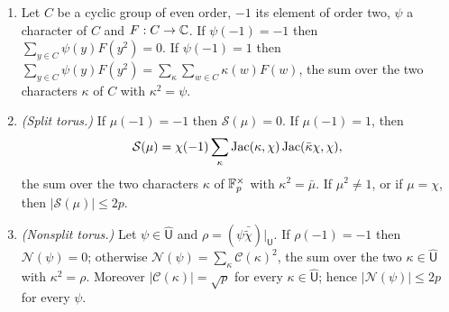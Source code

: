 \begin{lemma}\label{lem:dl:split}
\begin{enumerate}[label=\textup{(\alph*)}]
\item Let $C$ be a cyclic group of even order, $-1$ its element of order two,
  $\psi$ a character of $C$ and $F:C\to\mathbb C$. If $\psi(-1)=-1$ then
  $\sum_{y\in C}\psi(y)F(y^2)=0$. If $\psi(-1)=1$ then
  $\sum_{y\in C}\psi(y)F(y^2)=\sum_\kappa\sum_{w\in C}\kappa(w)F(w)$, the sum
  over the two characters $\kappa$ of $C$ with $\kappa^2=\psi$.
\item \emph{(Split torus.)} If $\mu(-1)=-1$ then $\mathcal S(\mu)=0$. If
  $\mu(-1)=1$, then
  \[
    \mathcal S(\mu)=\chi(-1)\sum_{\kappa}\operatorname{Jac}(\kappa,\chi)\operatorname{Jac}(\bar\kappa\chi,\chi),
  \]
  the sum over the two characters $\kappa$ of $\mathbb F_p^\times$ with
  $\kappa^2=\bar\mu$. If $\mu^2\ne1$, or if $\mu=\chi$, then
  $|\mathcal S(\mu)|\le2p$.
\item \emph{(Nonsplit torus.)} Let $\psi\in\widehat{\mathsf U}$ and
  $\rho=(\psi\bar{\tilde\chi})|_{\mathsf U}$. If $\rho(-1)=-1$ then
  $\mathcal N(\psi)=0$; otherwise
  $\mathcal N(\psi)=\sum_{\kappa}\mathcal C(\kappa)^2$, the sum over the two
  $\kappa\in\widehat{\mathsf U}$ with $\kappa^2=\rho$. Moreover
  $|\mathcal C(\kappa)|=\sqrt p$ for every $\kappa\in\widehat{\mathsf U}$; hence
  $|\mathcal N(\psi)|\le2p$ for every $\psi$.
\end{enumerate}
\end{lemma}

